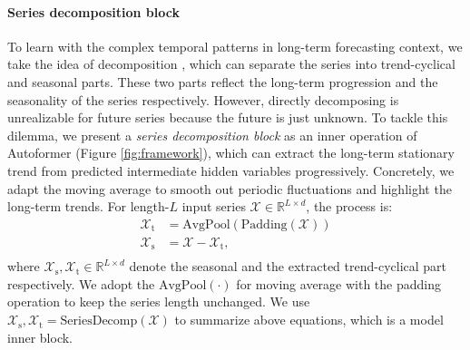 \vspace{-5pt}
\paragraph{Series decomposition block}
To learn with the complex temporal patterns in long-term forecasting context, we take the idea of decomposition \cite{Anderson1976TimeSeries2E,Cleveland1990STLAS}, which can separate the series into trend-cyclical and seasonal parts. These two parts reflect the long-term progression and the seasonality of the series respectively. However, directly decomposing is unrealizable for future series because the future is just unknown. To tackle this dilemma, we present a \textit{series decomposition block} as an inner operation of Autoformer (Figure \ref{fig:framework}), which can extract the long-term stationary trend from predicted intermediate hidden variables progressively. Concretely, we adapt the moving average to smooth out periodic fluctuations and highlight the long-term trends. For length-$L$ input series $\mathcal{X}\in\mathbb{R}^{L\times d}$, the process is:
\begin{equation}\label{equ:moving_avg}
  \begin{split}
  \mathcal{X}_{\mathrm{t}} & = \mathrm{AvgPool}(\mathrm{Padding}(\mathcal{X})) \\
  \mathcal{X}_{\mathrm{s}} & = \mathcal{X} - \mathcal{X}_{\mathrm{t}}, \\
  \end{split}
\end{equation}
where $\mathcal{X}_{\mathrm{s}},\mathcal{X}_{\mathrm{t}}\in\mathbb{R}^{L\times d}$ denote the seasonal and the extracted trend-cyclical part respectively. We adopt the $\mathrm{AvgPool}(\cdot)$ for moving average with the padding operation to keep the series length unchanged. We use $\mathcal{X}_{\mathrm{s}},\mathcal{X}_{\mathrm{t}}=\mathrm{SeriesDecomp}(\mathcal{X})$ to summarize above equations, which is a model inner block. 

\vspace{-5pt}
